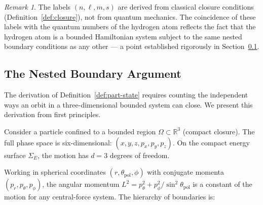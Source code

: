 \documentclass[twocolumn,10pt,a4paper]{article}
\theoremstyle{thmstyle}
\theoremstyle{definition}
\theoremstyle{remark}
\newtheorem{remark}[theorem]{Remark}
\newcommand{\R}{\mathbb{R}}
\begin{document}
\begin{remark}
The labels $(n, \ell, m, s)$ are derived from classical closure conditions (Definition~\ref{def:closure}), not from quantum mechanics. The coincidence of these labels with the quantum numbers of the hydrogen atom \citep{bohr1920,schrodinger1926} reflects the fact that the hydrogen atom is a bounded Hamiltonian system subject to the same nested boundary conditions as any other --- a point established rigorously in Section~\ref{sec:nested}.
\end{remark}

\subsection{The Nested Boundary Argument}
\label{sec:nested}

The derivation of Definition~\ref{def:part-state} requires counting the independent ways an orbit in a three-dimensional bounded system can close. We present this derivation from first principles.

Consider a particle confined to a bounded region $\Omega \subset \R^3$ (compact closure). The full phase space is six-dimensional: $(x, y, z, p_x, p_y, p_z)$. On the compact energy surface $\Sigma_E$, the motion has $d = 3$ degrees of freedom.

Working in spherical coordinates $(r, \theta_\text{pol}, \phi)$ with conjugate momenta $(p_r, p_\theta, p_\phi)$, the angular momentum $L^2 = p_\theta^2 + p_\phi^2 / \sin^2\theta_\text{pol}$ is a constant of the motion for any central-force system. The hierarchy of boundaries is:
\end{document}

